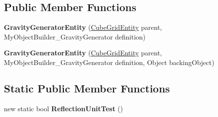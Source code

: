 \subsection*{Public Member Functions}
\begin{DoxyCompactItemize}
\item 
\hypertarget{class_s_e_mod_a_p_i_internal_1_1_a_p_i_1_1_entity_1_1_sector_1_1_sector_object_1_1_cube_grid_1_152f45445d79844991feac643e7a7ab7c_a9af4694fcab967922d54eda53bcc270a}{}{\bfseries Gravity\+Generator\+Entity} (\hyperlink{class_s_e_mod_a_p_i_internal_1_1_a_p_i_1_1_entity_1_1_sector_1_1_sector_object_1_1_cube_grid_entity}{Cube\+Grid\+Entity} parent, My\+Object\+Builder\+\_\+\+Gravity\+Generator definition)\label{class_s_e_mod_a_p_i_internal_1_1_a_p_i_1_1_entity_1_1_sector_1_1_sector_object_1_1_cube_grid_1_152f45445d79844991feac643e7a7ab7c_a9af4694fcab967922d54eda53bcc270a}

\item 
\hypertarget{class_s_e_mod_a_p_i_internal_1_1_a_p_i_1_1_entity_1_1_sector_1_1_sector_object_1_1_cube_grid_1_152f45445d79844991feac643e7a7ab7c_a44ea7eb123603d396e7f5ecdacb4394c}{}{\bfseries Gravity\+Generator\+Entity} (\hyperlink{class_s_e_mod_a_p_i_internal_1_1_a_p_i_1_1_entity_1_1_sector_1_1_sector_object_1_1_cube_grid_entity}{Cube\+Grid\+Entity} parent, My\+Object\+Builder\+\_\+\+Gravity\+Generator definition, Object backing\+Object)\label{class_s_e_mod_a_p_i_internal_1_1_a_p_i_1_1_entity_1_1_sector_1_1_sector_object_1_1_cube_grid_1_152f45445d79844991feac643e7a7ab7c_a44ea7eb123603d396e7f5ecdacb4394c}

\end{DoxyCompactItemize}
\subsection*{Static Public Member Functions}
\begin{DoxyCompactItemize}
\item 
\hypertarget{class_s_e_mod_a_p_i_internal_1_1_a_p_i_1_1_entity_1_1_sector_1_1_sector_object_1_1_cube_grid_1_152f45445d79844991feac643e7a7ab7c_a1201a4f76acfcba29f134d1e680d1a9c}{}new static bool {\bfseries Reflection\+Unit\+Test} ()\label{class_s_e_mod_a_p_i_internal_1_1_a_p_i_1_1_entity_1_1_sector_1_1_sector_object_1_1_cube_grid_1_152f45445d79844991feac643e7a7ab7c_a1201a4f76acfcba29f134d1e680d1a9c}

\end{DoxyCompactItemize}
